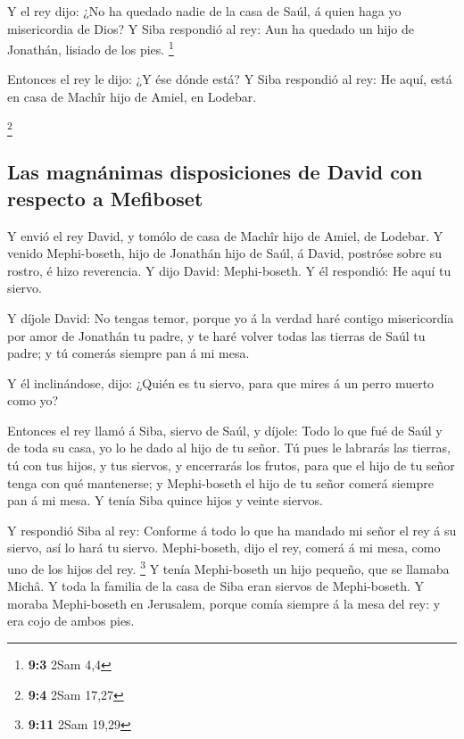  Y el rey dijo: ¿No ha quedado nadie de la casa de Saúl, á
quien haga yo misericordia de Dios? Y Siba respondió al rey: Aun ha
quedado un hijo de Jonathán, lisiado de los pies. \footnote{\textbf{9:3}
  2Sam 4,4}

 Entonces el rey le dijo: ¿Y ése dónde está? Y Siba
respondió al rey: He aquí, está en casa de Machîr hijo de Amiel, en
Lodebar.

\footnote{\textbf{9:4} 2Sam 17,27}

\hypertarget{las-magnuxe1nimas-disposiciones-de-david-con-respecto-a-mefiboset}{%
\subsection{Las magnánimas disposiciones de David con respecto a
Mefiboset}\label{las-magnuxe1nimas-disposiciones-de-david-con-respecto-a-mefiboset}}

 Y envió el rey David, y tomólo de casa de Machîr hijo de
Amiel, de Lodebar.  Y venido Mephi-boseth, hijo de Jonathán
hijo de Saúl, á David, postróse sobre su rostro, é hizo reverencia. Y
dijo David: Mephi-boseth. Y él respondió: He aquí tu siervo.

 Y díjole David: No tengas temor, porque yo á la verdad haré
contigo misericordia por amor de Jonathán tu padre, y te haré volver
todas las tierras de Saúl tu padre; y tú comerás siempre pan á mi mesa.

 Y él inclinándose, dijo: ¿Quién es tu siervo, para que
mires á un perro muerto como yo?

 Entonces el rey llamó á Siba, siervo de Saúl, y díjole:
Todo lo que fué de Saúl y de toda su casa, yo lo he dado al hijo de tu
señor.  Tú pues le labrarás las tierras, tú con tus hijos,
y tus siervos, y encerrarás los frutos, para que el hijo de tu señor
tenga con qué mantenerse; y Mephi-boseth el hijo de tu señor comerá
siempre pan á mi mesa. Y tenía Siba quince hijos y veinte siervos.

 Y respondió Siba al rey: Conforme á todo lo que ha mandado
mi señor el rey á su siervo, así lo hará tu siervo. Mephi-boseth, dijo
el rey, comerá á mi mesa, como uno de los hijos del rey. \footnote{\textbf{9:11}
  2Sam 19,29}  Y tenía Mephi-boseth un hijo pequeño, que se
llamaba Michâ. Y toda la familia de la casa de Siba eran siervos de
Mephi-boseth.  Y moraba Mephi-boseth en Jerusalem, porque
comía siempre á la mesa del rey: y era cojo de ambos pies.

